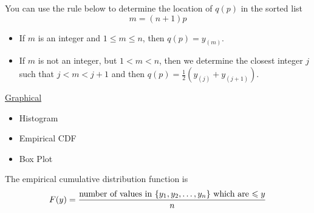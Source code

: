 You can use the rule below to determine the location of $ q(p) $ in the sorted list
\[ m=(n+1)p \]
\begin{itemize}
    \item If $ m $ is an integer and $ 1\leqslant m\leqslant n $, then $ q(p)=y_{(m)} $.
    \item If $ m $ is not an integer, but $ 1<m<n $, then we determine the closest integer $ j $ such
          that $ j < m < j+1 $ and then $ q(p)=\frac{1}{2} \left( y_{(j)}+y_{(j+1)} \right) $.
\end{itemize}

\underline{Graphical}
\begin{itemize}
    \item Histogram
    \item Empirical CDF
    \item Box Plot
\end{itemize}
The empirical cumulative distribution function is
\[ F(y)=\frac{\text{number of values in $ \{y_1,y_2,\ldots ,y_n\} $ which are $ \leqslant y $}}{n} \]
